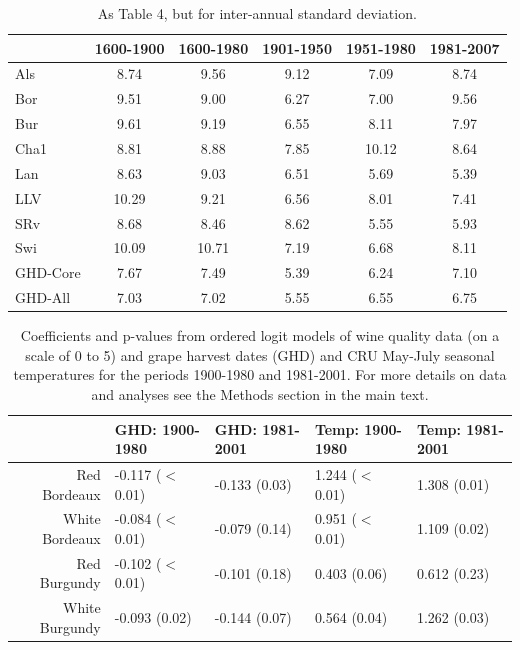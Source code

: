 \documentclass[12pt]{article}
\begin{document}
\begin{table}
\small
\caption{\small As Table 4, but for inter-annual standard deviation.}
\centering
\begin{tabular}{l c c c c c}
\hline
& \bf 1600-1900 & \bf 1600-1980 & \bf 1901-1950 & \bf 1951-1980 & \bf 1981-2007\\
\hline
Als	& 8.74	& 9.56	& 9.12	& 7.09	& 8.74\\
Bor	& 9.51	& 9.00	& 6.27	& 7.00	& 9.56\\
Bur	& 9.61 & 9.19 & 6.55 & 8.11 & 7.97\\
Cha1 & 8.81 & 8.88 & 7.85 & 10.12 & 8.64\\
Lan & 8.63 & 9.03 & 6.51 & 5.69 & 5.39\\
LLV	& 10.29 & 9.21 & 6.56 & 8.01 & 7.41\\
SRv & 8.68 & 8.46 & 8.62 & 5.55 & 5.93\\
Swi	& 10.09	& 10.71	& 7.19	& 6.68	& 8.11\\
\hline
GHD-Core & 7.67 & 7.49 & 5.39 & 6.24 & 7.10\\
GHD-All	& 7.03 & 7.02 & 5.55 & 6.55 & 6.75\\
\hline
\end{tabular}
\end{table}

\begin{table}
\centering
\caption{Coefficients and p-values from ordered logit models of wine quality data (on a scale of 0 to 5) and grape harvest dates (GHD) and CRU May-July seasonal temperatures for the periods 1900-1980 and 1981-2001. For more details on data and analyses see the Methods section in the main text.} 
\begin{tabular}{|r||l|l||l|l|}
  \hline
 & GHD: 1900-1980 & GHD: 1981-2001 & Temp: 1900-1980 & Temp: 1981-2001 \\ 
  \hline
Red Bordeaux & -0.117 ($<$0.01) & -0.133 (0.03) & 1.244 ($<$0.01) & 1.308 (0.01) \\ 
  White Bordeaux & -0.084 ($<$0.01) & -0.079 (0.14) & 0.951 ($<$0.01) & 1.109 (0.02) \\ 
  Red Burgundy & -0.102 ($<$0.01) & -0.101 (0.18) & 0.403 (0.06) & 0.612 (0.23) \\ 
  White Burgundy & -0.093 (0.02) & -0.144 (0.07) & 0.564 (0.04) & 1.262 (0.03) \\ 
   \hline
\end{tabular}
\end{table}%
\end{document}
